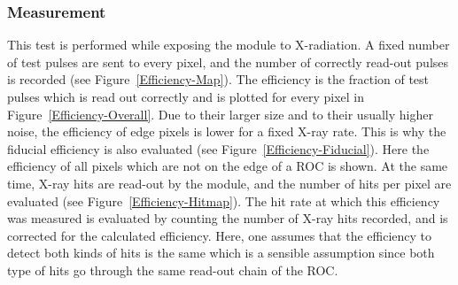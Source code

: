 \documentclass[a4paper,12pt,twoside]{article}
\begin{document}
\subsubsection{Measurement}

This test is performed while exposing the module to X-radiation. A fixed number of test pulses are sent to every pixel, and the number of correctly read-out pulses is recorded (see Figure~\ref{Efficiency-Map}). The efficiency is the fraction of test pulses which is read out correctly and is plotted for every pixel in Figure~\ref{Efficiency-Overall}. Due to their larger size and to their usually higher noise, the efficiency of edge pixels is lower for a fixed X-ray rate. This is why the fiducial efficiency is also evaluated (see Figure~\ref{Efficiency-Fiducial}). Here
the efficiency of all pixels which are not on the edge of a ROC is shown. At the same time, X-ray hits are read-out by the module, and the number of hits per pixel are evaluated (see Figure~\ref{Efficiency-Hitmap}). The hit rate at which this efficiency was measured is evaluated by counting the number of X-ray hits recorded, and is corrected for the calculated efficiency. Here, one assumes that the efficiency to detect both kinds of hits is the same which is a sensible assumption since both type of hits go through the same read-out chain of the ROC.
\end{document}
